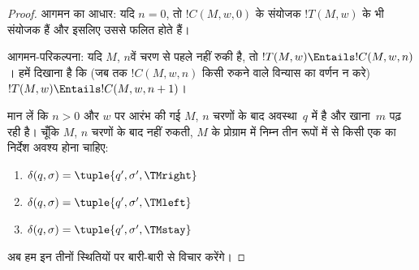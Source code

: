 \documentclass[../../../include/open-logic-section]{subfiles}
\begin{document}
\begin{proof}
आगमन का आधार: यदि $n = 0$, तो $!C(M, w, 0)$ के संयोजक
$!T(M, w)$ के भी संयोजक हैं और इसलिए उससे फलित होते हैं।

आगमन-परिकल्पना: यदि $M$, $n$वें चरण से पहले नहीं रुकी है, तो
$!T(M,w) \Entails !C(M, w, n)$। हमें दिखाना है कि (जब तक
$!C(M, w, n)$ किसी रुकने वाले विन्यास का वर्णन न करे)
$!T(M, w) \Entails !C(M, w, n+1)$।

मान लें कि $n > 0$ और $w$ पर आरंभ की गई $M$, $n$ चरणों के बाद
अवस्था~$q$ में है और खाना~$m$ पढ़ रही है। चूँकि $M$, $n$ चरणों के बाद
नहीं रुकती, $M$ के प्रोग्राम में निम्न तीन रूपों में से किसी एक का निर्देश
अवश्य होना चाहिए:

\begin{enumerate}
\item {} $\delta(q, \sigma) = \tuple{q', \sigma', \TMright}$

\item {} $\delta(q, \sigma) = \tuple{q', \sigma', \TMleft}$

\item {} $\delta(q, \sigma) = \tuple{q', \sigma', \TMstay}$
\end{enumerate}

अब हम इन तीनों स्थितियों पर बारी-बारी से विचार करेंगे।


\end{proof}
\end{document}
